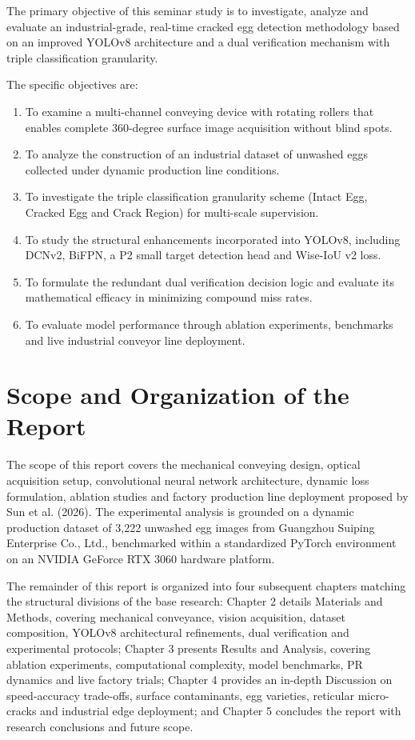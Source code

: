 \documentclass[12pt,a4paper]{report}
\begin{document}
The primary objective of this seminar study is to investigate, analyze and evaluate an industrial-grade, real-time cracked egg detection methodology based on an improved YOLOv8 architecture and a dual verification mechanism with triple classification granularity.

The specific objectives are:
\begin{enumerate}[label=\arabic*.]
    \item To examine a multi-channel conveying device with rotating rollers that enables complete 360-degree surface image acquisition without blind spots.
    \item To analyze the construction of an industrial dataset of unwashed eggs collected under dynamic production line conditions.
    \item To investigate the triple classification granularity scheme (Intact Egg, Cracked Egg and Crack Region) for multi-scale supervision.
    \item To study the structural enhancements incorporated into YOLOv8, including DCNv2, BiFPN, a P2 small target detection head and Wise-IoU v2 loss.
    \item To formulate the redundant dual verification decision logic and evaluate its mathematical efficacy in minimizing compound miss rates.
    \item To evaluate model performance through ablation experiments, benchmarks and live industrial conveyor line deployment.
\end{enumerate}

\section{Scope and Organization of the Report}

The scope of this report covers the mechanical conveying design, optical acquisition setup, convolutional neural network architecture, dynamic loss formulation, ablation studies and factory production line deployment proposed by Sun et al. (2026). The experimental analysis is grounded on a dynamic production dataset of 3,222 unwashed egg images from Guangzhou Suiping Enterprise Co., Ltd., benchmarked within a standardized PyTorch environment on an NVIDIA GeForce RTX 3060 hardware platform.

The remainder of this report is organized into four subsequent chapters matching the structural divisions of the base research: Chapter 2 details Materials and Methods, covering mechanical conveyance, vision acquisition, dataset composition, YOLOv8 architectural refinements, dual verification and experimental protocols; Chapter 3 presents Results and Analysis, covering ablation experiments, computational complexity, model benchmarks, PR dynamics and live factory trials; Chapter 4 provides an in-depth Discussion on speed-accuracy trade-offs, surface contaminants, egg varieties, reticular micro-cracks and industrial edge deployment; and Chapter 5 concludes the report with research conclusions and future scope.
\end{document}
